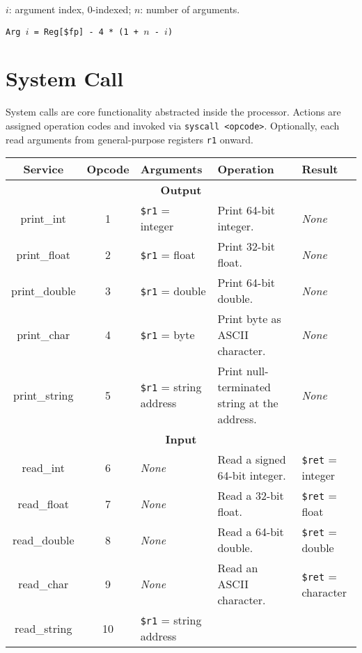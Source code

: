 \documentclass{article}
\begin{document}
\begin{center}
    \(i\): argument index, 0-indexed; \(n\): number of arguments.
    
    \texttt{Arg \(i\) = Reg[\$fp] - 4 * (1 + \(n\) - \(i\))}
\end{center}

\section{System Call}

System calls are core functionality abstracted inside the processor.
Actions are assigned operation codes and invoked via \texttt{syscall <opcode>}.
Optionally, each read arguments from general-purpose registers \texttt{r1} onward.

\bigskip
\begin{longtable}{|c|c|l|l|l|}
    \hline
    \textbf{Service} & \textbf{Opcode} & \textbf{Arguments} & \textbf{Operation} & \textbf{Result} \\
    \hline
    \multicolumn{5}{|c|}{\textbf{Output}} \\
    \hline
    print\_int & 1 & \texttt{\$r1} = integer & Print 64-bit integer. & \textit{None} \\
    \hline
    print\_float & 2 & \texttt{\$r1} = float & Print 32-bit float. & \textit{None} \\
    \hline
    print\_double & 3 & \texttt{\$r1} = double & Print 64-bit double. & \textit{None} \\
    \hline
    print\_char & 4 & \texttt{\$r1} = byte & Print byte as ASCII character. & \textit{None} \\
    \hline
    print\_string & 5 & \texttt{\$r1} = string address & Print null-terminated string at the address. & \textit{None} \\
    \hline \hline
    \multicolumn{5}{|c|}{\textbf{Input}} \\
    \hline
    read\_int & 6 & \textit{None} & Read a signed 64-bit integer. & \texttt{\$ret} = integer \\
    \hline
    read\_float & 7 & \textit{None} & Read a 32-bit float. & \texttt{\$ret} = float \\
    \hline
    read\_double & 8 & \textit{None} & Read a 64-bit double. & \texttt{\$ret} = double \\
    \hline
    read\_char & 9 & \textit{None} & Read an ASCII character. & \texttt{\$ret} = character \\
    \hline
    read\_string & 10 & \makecell[l]{\texttt{\$r1} = string address\\%
}
\end{longtable}
\end{document}
